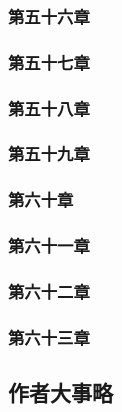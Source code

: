 \subsubsection{第五十六章}



\subsubsection{第五十七章}



\subsubsection{第五十八章}



\subsubsection{第五十九章}



\subsubsection{第六十章}



\subsubsection{第六十一章}



\subsubsection{第六十二章}



\subsubsection{第六十三章}



\subsection{作者大事略}








